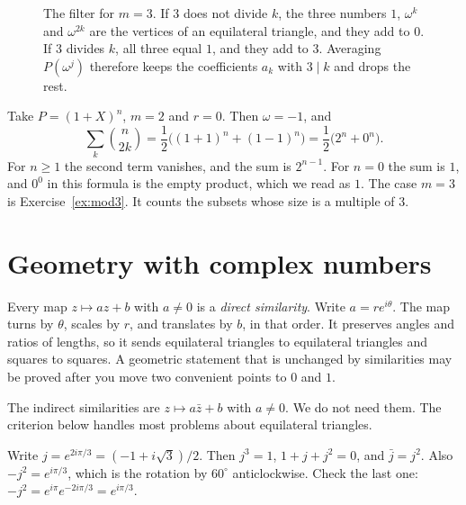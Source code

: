 \begin{figure}[ht]
\centering
{}
\caption{The filter for $m=3$. If $3$ does not divide $k$, the three numbers $1$, $\omega^k$ and $\omega^{2k}$ are the vertices of an equilateral triangle, and they add to $0$. If $3$ divides $k$, all three equal $1$, and they add to $3$. Averaging $P(\omega^j)$ therefore keeps the coefficients $a_k$ with $3\mid k$ and drops the rest.}
\label{fig:filter}
\end{figure}

\begin{example}
Take $P=(1+X)^n$, $m=2$ and $r=0$. Then $\omega=-1$, and
\[
\sum_k\binom n{2k}=\frac12\bigl((1+1)^n+(1-1)^n\bigr)=\frac12\bigl(2^n+0^n\bigr).
\]
For $n\ge1$ the second term vanishes, and the sum is $2^{n-1}$. For $n=0$ the sum is $1$, and $0^0$ in this formula is the empty product, which we read as $1$. The case $m=3$ is Exercise~\ref{ex:mod3}. It counts the subsets whose size is a multiple of $3$.
\end{example}

\section{Geometry with complex numbers}

Every map $z\mapsto az+b$ with $a\ne0$ is a \emph{direct similarity}. Write $a=re^{i\theta}$. The map turns by $\theta$, scales by $r$, and translates by $b$, in that order. It preserves angles and ratios of lengths, so it sends equilateral triangles to equilateral triangles and squares to squares. A geometric statement that is unchanged by similarities may be proved after you move two convenient points to $0$ and $1$.

The indirect similarities are $z\mapsto a\bar z+b$ with $a\ne0$. We do not need them. The criterion below handles most problems about equilateral triangles.

Write $j=e^{2i\pi/3}=(-1+i\sqrt3)/2$. Then $j^3=1$, $1+j+j^2=0$, and $\bar j=j^2$. Also $-j^2=e^{i\pi/3}$, which is the rotation by $60^\circ$ anticlockwise. Check the last one: $-j^2=e^{i\pi}e^{-2i\pi/3}=e^{i\pi/3}$.

